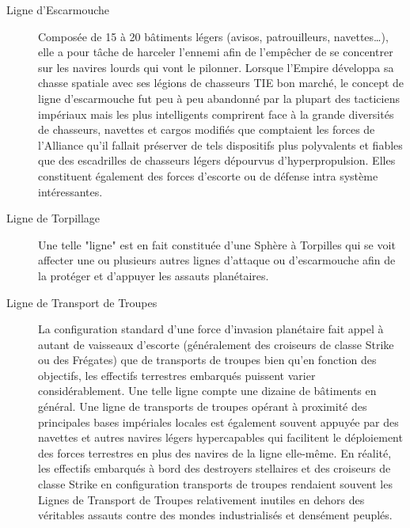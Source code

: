 \documentclass[twoside]{article}
\begin{document}
\begin{description}
	\item[Ligne d'Escarmouche] Composée de 15 à 20 bâtiments légers (avisos, patrouilleurs, navettes\ldots), elle a pour tâche de harceler l'ennemi afin de l'empêcher de se concentrer sur les navires lourds qui vont le pilonner. Lorsque l'Empire développa sa chasse spatiale avec ses légions de chasseurs TIE bon marché, le concept de ligne d'escarmouche fut peu à peu abandonné par la plupart des tacticiens impériaux mais les plus intelligents comprirent face à la grande diversités de chasseurs, navettes et cargos modifiés que comptaient les forces de l'Alliance qu'il fallait préserver de tels dispositifs plus polyvalents et fiables que des escadrilles de chasseurs légers dépourvus d'hyperpropulsion. Elles constituent également des forces d'escorte ou de défense intra système intéressantes.
	\item[Ligne de Torpillage] Une telle "ligne" est en fait constituée d'une Sphère à Torpilles qui se voit affecter une ou plusieurs autres lignes d'attaque ou d'escarmouche afin de la protéger et d'appuyer les assauts planétaires.
	\item[Ligne de Transport de Troupes] La configuration standard d'une force d'invasion planétaire fait appel à autant de vaisseaux d'escorte (généralement des croiseurs de classe Strike ou des Frégates) que de transports de troupes bien qu'en fonction des objectifs, les effectifs terrestres embarqués puissent varier considérablement. Une telle ligne compte une dizaine de bâtiments en général. Une ligne de transports de troupes opérant à proximité des principales bases impériales locales est également souvent appuyée par des navettes et autres navires légers hypercapables qui facilitent le déploiement des forces terrestres en plus des navires de la ligne elle-même. En réalité, les effectifs embarqués à bord des destroyers stellaires et des croiseurs de classe Strike en configuration transports de troupes rendaient souvent les Lignes de Transport de Troupes relativement inutiles en dehors des véritables assauts contre des mondes industrialisés et densément peuplés.
\end{description}
\end{document}
